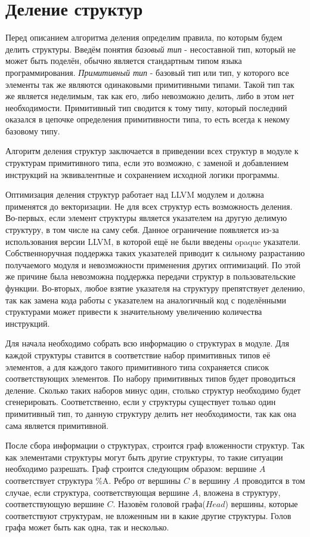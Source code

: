 \section{Деление структур}
\label{sec:Background}

Перед описанием алгоритма деления определим правила, по которым будем делить структуры. Введём понятия \emph{базовый тип} - несоставной тип, который не может быть поделён, обычно является стандартным типом языка программирования. \emph{Примитивный тип} - базовый тип или тип, у которого все элементы так же являются одинаковыми примитивными типами. Такой тип так же является неделимым, так как его, либо невозможно делить, либо в этом нет необходимости. Примитивный тип сводится к тому типу, который последний оказался в цепочке определения примитивности типа, то есть всегда к некому базовому типу.

Алгоритм деления структур заключается в приведении всех структур в модуле к структурам примитивного типа, если это возможно, с заменой и добавлением инструкций на эквивалентные и сохранением исходной логики программы.

Оптимизация деления структур работает над LLVM модулем и должна применятся до векторизации. Не для всех структур есть возможность деления. Во-первых, если элемент структуры является указателем на другую делимую структуру, в том числе на саму себя. Данное ограничение появляется из-за использования версии LLVM, в которой ещё не были введены opaque указатели. Собственноручная поддержка таких указателей приводит к сильному разрастанию получаемого модуля и невозможности применения других оптимизаций. По этой же причине была невозможна поддержка передачи структур в пользовательские функции. Во-вторых, любое взятие указателя на структуру препятствует делению, так как замена кода работы с указателем на аналогичный код с поделёнными структурами может привести к значительному увеличению количества инструкций.

Для начала необходимо собрать всю информацию о структурах в модуле. Для каждой структуры ставится в соответствие набор примитивных типов её элементов, а для каждого такого примитивного типа сохраняется список соответствующих элементов. По набору примитивных типов будет проводиться деление. Сколько таких наборов минус один, столько структур необходимо будет сгенерировать. Соответственно, если у структуры существует только один примитивный тип, то данную структуру делить нет необходимости, так как она сама является примитивной.

После сбора информации о структурах, строится граф вложенности структур. Так как элементами структуры могут быть другие структуры, то такие ситуации необходимо разрешать. Граф строится следующим образом: вершине $A$ соответствует структура \%A. Ребро от вершины $C$ в вершину $A$ проводится в том случае, если структура, соответствующая вершине $A$, вложена в структуру, соответствующую вершине $C$. Назовём головой графа($Head$) вершины, которые соответствуют структурам, не вложенным ни в какие другие структуры. Голов графа может быть как одна, так и несколько.

